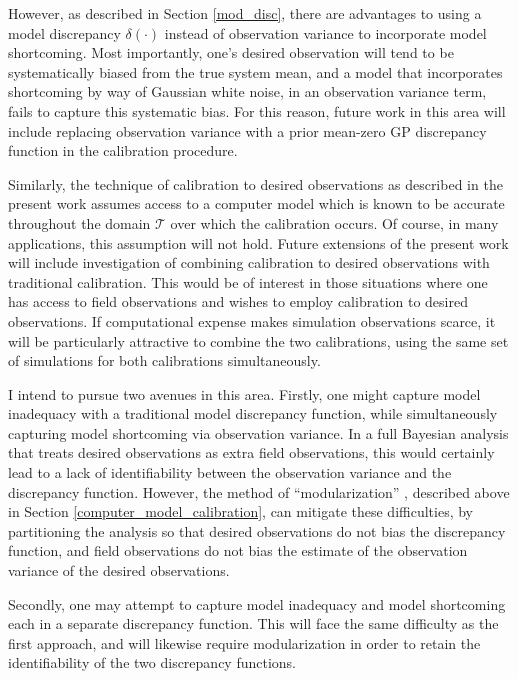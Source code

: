 \documentclass{article}
\begin{document}
However, as described in Section \ref{mod_disc}, there are advantages to using a model discrepancy $\delta(\cdot)$ instead of observation variance to incorporate model shortcoming. Most importantly, one's desired observation will tend to be systematically biased from the true system mean, and a model that incorporates shortcoming by way of Gaussian white noise, in an observation variance term, fails to capture this systematic bias. For this reason, future work in this area will include replacing observation variance with a prior mean-zero GP discrepancy function in the calibration procedure.

Similarly, the technique of calibration to desired observations as described in the present work assumes access to a computer model which is known to be accurate throughout the domain $\mathcal T$ over which the calibration occurs. Of course, in many applications, this assumption will not hold. Future extensions of the present work will include investigation of combining calibration to desired observations with traditional calibration. This would be of interest in those situations where one has access to field observations and wishes to employ calibration to desired observations. If computational expense makes simulation observations scarce, it will be particularly attractive to combine the two calibrations, using the same set of simulations for both calibrations simultaneously.

I intend to pursue two avenues in this area. Firstly, one might capture model inadequacy with a traditional model discrepancy function, while simultaneously capturing model shortcoming via observation variance. In a full Bayesian analysis that treats desired observations as extra field observations, this would certainly lead to a lack of identifiability between the observation variance and the discrepancy function. However, the method of ``modularization'' \citep{Liu2009,Bayarri2007,Bayarri}, described above in Section \ref{computer_model_calibration}, can mitigate these difficulties, by partitioning the analysis so that desired observations do not bias the discrepancy function, and field observations do not bias the estimate of the observation variance of the desired observations.

Secondly, one may attempt to capture model inadequacy and model shortcoming each in a separate discrepancy function. This will face the same difficulty as the first approach, and will likewise require modularization in order to retain the identifiability of the two discrepancy functions.
\end{document}
